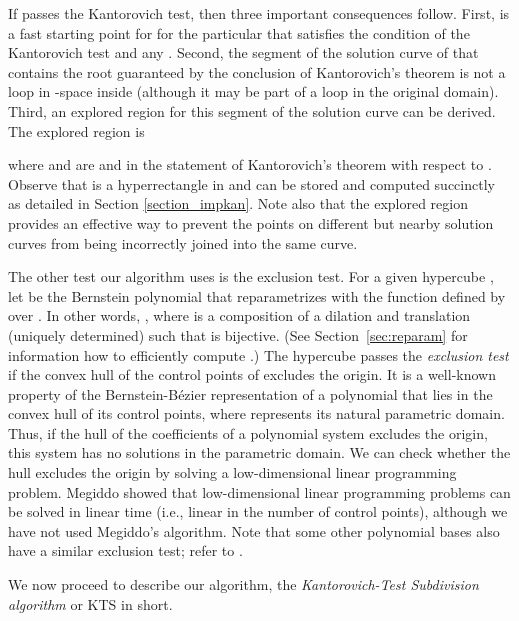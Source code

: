 \documentclass{article}
\begin{document}
If  passes the Kantorovich test, then three important consequences
follow.  First,  is a fast starting point for
 for the particular  that satisfies the condition of
the Kantorovich test and any . Second,
the segment of the solution curve of  that contains the root
guaranteed by the conclusion of Kantorovich's theorem is not a loop in -space inside  (although it may be part of a loop in the
original domain).  Third, an explored region for this segment of the
solution curve can be derived. The explored region is

where  and  are  and 
in the statement of Kantorovich's theorem with respect to
.  Observe that  is a hyperrectangle in
 and can be stored and computed succinctly as
detailed in Section \ref{section_impkan}.  Note also that the
explored region provides an effective way to prevent the points on
different but nearby solution curves from being incorrectly
joined into the same curve.

The other test our algorithm uses is the exclusion test. For a
given hypercube , let  be the Bernstein polynomial
that reparametrizes with  the function defined by  over
.  In other words, , where
 is a composition of a dilation and translation
(uniquely determined) such that  is
bijective.  (See Section~\ref{sec:reparam} for information how to
efficiently compute .)
The hypercube  passes the \emph{exclusion test} if the
convex hull of the control points of  excludes the
origin.  It is a well-known property of the Bernstein-B\'ezier representation
of a polynomial  that 
lies in the convex hull of its control
points, where  represents its natural parametric domain.
Thus, if the hull of the coefficients of a polynomial system
excludes the origin, this system has no solutions in the parametric domain.
We can check whether the hull excludes the origin by solving a low-dimensional
linear programming problem.  Megiddo \cite{Megiddo} showed that low-dimensional linear
programming problems can be solved in linear time (i.e., linear in the number
of control points), although we have not used Megiddo's algorithm.
Note that some other polynomial bases also have a similar exclusion test;
refer to \cite{srijuntongsiri_basis}.

We now proceed to describe our algorithm, the
\emph{Kantorovich-Test Subdivision algorithm} or KTS in short.
\end{document}
